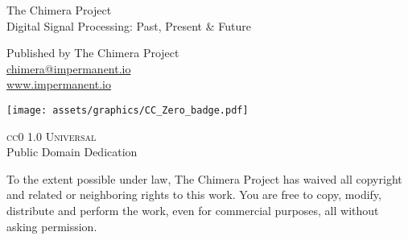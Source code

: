 \newpage
\thispagestyle{empty}
\vspace*{\fill}
\begin{center}

{\lorettadisplay\large The Chimera Project} \\[1cm]
{\loretta Digital Signal Processing: Past, Present \& Future}


\vspace{1.5cm}

{\loretta
Published by The Chimera Project\\
\href{mailto:chimera@impermanent.io}{chimera@impermanent.io}\\
\url{www.impermanent.io}
}

\vspace{2cm}

\texttt{[image: assets/graphics/CC\_Zero\_badge.pdf]}

\vspace{0.8cm}

{\large\textsc{cc0 1.0 Universal}}\\
\vspace{0.3cm}
{\normalsize Public Domain Dedication}

\vspace{1.5cm}

\begin{minipage}{0.75\textwidth}
\loretta\small\justifying
To the extent possible under law, The Chimera Project has waived all copyright and related or neighboring rights to this work. You are free to copy, modify, distribute and perform the work, even for commercial purposes, all without asking permission.
\end{minipage}

\end{center}
\vspace*{\fill}
\newpage